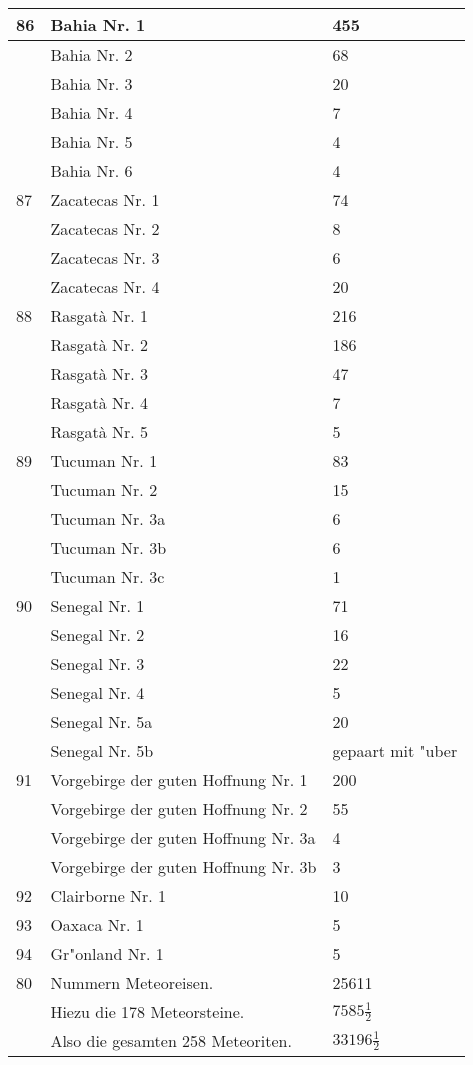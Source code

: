 \documentclass[a4paper, 11pt, oneside, polutonikogreek, german]{article}
\begin{document}
\begin{center}
\begin{longtable}{|l|l|l|}
        86 & Bahia Nr. 1 & 455 \\ \hline
          & Bahia Nr. 2 & 68 \\ \hline
          & Bahia Nr. 3 & 20 \\ \hline
          & Bahia Nr. 4 & 7 \\ \hline
          & Bahia Nr. 5 & 4 \\ \hline
          & Bahia Nr. 6 & 4 \\ \hline
        87 & Zacatecas Nr. 1 & 74 \\ \hline
          & Zacatecas Nr. 2 & 8 \\ \hline
          & Zacatecas Nr. 3 & 6 \\ \hline
          & Zacatecas Nr. 4 & 20 \\ \hline
        88 & Rasgatà Nr. 1 & 216 \\ \hline
          & Rasgatà Nr. 2 & 186 \\ \hline
          & Rasgatà Nr. 3 & 47 \\ \hline
          & Rasgatà Nr. 4 & 7 \\ \hline
          & Rasgatà Nr. 5 & 5 \\ \hline
        89 & Tucuman Nr. 1 & 83 \\ \hline
          & Tucuman Nr. 2 & 15 \\ \hline
          & Tucuman Nr. 3a & 6 \\ \hline
          & Tucuman Nr. 3b & 6 \\ \hline
          & Tucuman Nr. 3c & 1 \\ \hline
        90 & Senegal Nr. 1 & 71 \\ \hline
          & Senegal Nr. 2 & 16 \\ \hline
          & Senegal Nr. 3 & 22 \\ \hline
          & Senegal Nr. 4 & 5 \\ \hline
          & Senegal Nr. 5a & 20 \\ \hline
          & Senegal Nr. 5b & gepaart mit "uber \\ \hline
        91 & Vorgebirge der guten Hoffnung Nr. 1 & 200 \\ \hline
          & Vorgebirge der guten Hoffnung Nr. 2 & 55 \\ \hline
          & Vorgebirge der guten Hoffnung Nr. 3a & 4 \\ \hline
          & Vorgebirge der guten Hoffnung Nr. 3b & 3 \\ \hline
        92 & Clairborne Nr. 1 & 10 \\ \hline
        93 & Oaxaca Nr. 1 & 5 \\ \hline
        94 & Gr"onland Nr. 1 & 5 \\ \hline
        80 & Nummern Meteoreisen. & 25611 \\ \hline
          & Hiezu die 178 Meteorsteine. & $7585\frac{1}{2}$ \\ \hline
          & Also die gesamten 258 Meteoriten. & $33196\frac{1}{2}$ \\ \hline
    \end{longtable}
\end{center}
\clearpage
\end{document}
